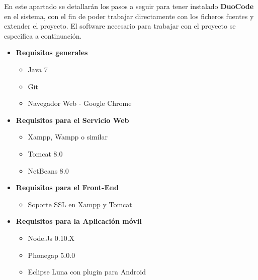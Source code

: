 En este apartado se detallarán los pasos a seguir para tener instalado \textbf{DuoCode} en el sistema, con el fin de poder trabajar directamente con los ficheros fuentes y extender el proyecto. El software necesario para trabajar con el proyecto se especifica a continuación.

\begin{itemize}
\item \textbf{Requisitos generales}
\begin{itemize}
\item Java 7
\item Git
\item Navegador Web - Google Chrome
\end{itemize}
\end{itemize}
\begin{itemize}
\item \textbf{Requisitos para el Servicio Web}
\begin{itemize}
\item Xampp, Wampp o similar
\item Tomcat 8.0
\item NetBeans 8.0
\end{itemize}
\end{itemize}
\begin{itemize}
\item \textbf{Requisitos para el Front-End}

\begin{itemize}
\item Soporte SSL en Xampp y Tomcat
\end{itemize}
\end{itemize}
\begin{itemize}
\item \textbf{Requisitos para la Aplicación móvil}
\begin{itemize}
\item Node.Js 0.10.X
\item Phonegap 5.0.0
\item Eclipse Luna con plugin para Android
\end{itemize}
\end{itemize}

